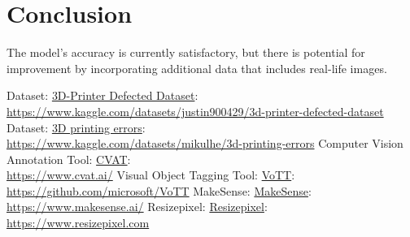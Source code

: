 \documentclass[12pt,a4paper]{article}
\begin{document}
\clearpage
\section{Conclusion}
The model's accuracy is currently satisfactory, but there is potential for improvement by incorporating additional data that includes real-life images.

\newpage
\clearpage
\begin{thebibliography}{9}

        Dataset: \href{https://www.kaggle.com/datasets/justin900429/3d-printer-defected-dataset}{3D-Printer Defected Dataset}: \\
        {\footnotesize \url{https://www.kaggle.com/datasets/justin900429/3d-printer-defected-dataset}}
        Dataset: \href{https://www.kaggle.com/datasets/mikulhe/3d-printing-errors}{3D printing errors}: \\
        {\footnotesize \url{https://www.kaggle.com/datasets/mikulhe/3d-printing-errors}}
        Computer Vision Annotation Tool: \href{https://www.cvat.ai/}{CVAT}: \\
        {\footnotesize \url{https://www.cvat.ai/}}
        Visual Object Tagging Tool: \href{https://github.com/microsoft/VoTT}{VoTT}: \\
        {\footnotesize \url{https://github.com/microsoft/VoTT}}
        MakeSense: \href{https://www.makesense.ai/}{MakeSense}: \\
        {\footnotesize \url{https://www.makesense.ai/}}
    Resizepixel: \href{https://www.resizepixel.com}{Resizepixel}: \\
        {\footnotesize \url{https://www.resizepixel.com}}

    \end{thebibliography}
\end{document}
